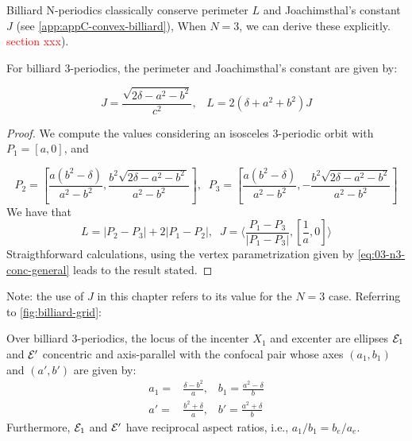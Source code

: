 Billiard N-periodics classically conserve  perimeter $L$ and Joachimsthal's constant $J$ (see \cref{app:appC-convex-billiard}), 
When $N=3$, we can derive these explicitly.
\textcolor{red}{section xxx}).

\begin{proposition}
For billiard 3-periodics, the perimeter and Joachimsthal's constant are given by:

\begin{equation*}
J=\frac{\sqrt{2\delta-a^2-b^2}}{c^2},\;\;\;L=2(\delta+a^2+b^2)J
\label{eqn:n3-L-J}
\end{equation*}
\end{proposition}

\begin{proof} We compute the values considering  an isosceles 3-periodic orbit with $P_1=[a,0]$, and

 {\small 
 \begin{equation} \label{eq:orbita3-isosceles}
 P_2=\left[   {\frac {a \left(  {b}^{2}-\delta \right) }{   a^2-b^2 
 			  }},{\frac {{b}^{2}\sqrt {2 \delta -{a}^{2}-{b}^{2}\,
 				}}{{a}^{2}-{b}^{2}}} 
 	\right], \;\; P_3=\left[  {\frac {a \left(  {b}^{2}-\delta \right) }{   a^2-b^2   
 	}},-{\frac {{b}^{2}\sqrt {2\delta-{a}^{2}-{b}^{2} 
 				}}{{a}^{2}-{b}^{2}}} 
 	\right]
 	\end{equation}
 	}
 	We have that
 	\[L=|P_2-P_3|+2|P_1-P_2|,\;\;
 	 J=\langle \frac{P_1-P_3}{|P_1-P_3|},[\frac{1}{a},0]\rangle\]
 	 Straigthforward calculations, using the vertex parametrization given by  \cref{eq:03-n3-conc-general} leads to the result stated.
\end{proof}

\noindent Note: the use of $J$ in this chapter refers to its value for the $N=3$ case. Referring to \cref{fig:billiard-grid}:

\begin{theorem}
Over billiard 3-periodics, the locus of the incenter $X_1$ and excenter are ellipses $\mathcal{E}_1$ and $\mathcal{E}'$ concentric and axis-parallel with the confocal pair whose axes $(a_1,b_1)$ and $(a',b')$ are given by:
\begin{align*}
a_1 =& \frac{\delta-b^2 }{a},\;\;\;b_1=\frac{a^2-\delta}{b}\\ 
a'= &\frac{{b}^{2}+\delta}{a},\;\;\;b'=\frac{{a}^{2}+\delta}{b}
\end{align*}
Furthermore, $\mathcal{E}_1$ and $\mathcal{E}'$ have reciprocal aspect ratios, i.e., $a_1/b_1=b_e/a_e$.
\label{thm:03-incenter-excenter}
\end{theorem}

